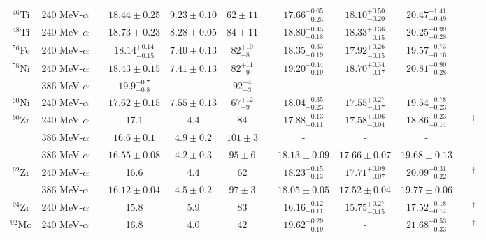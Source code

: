\begin{table}[t!]
{\begin{tabular}{@{}cccccccccc@{}cc}
$^{46}$Ti & 240 MeV-$\alpha$ & & $18.44\pm0.25$ & $9.23\pm0.10$ & $62\pm11 $ & & ${17.66}^{+0.65}_{-0.25}$ & ${18.10}^{+0.50}_{-0.20}$ & ${20.47}^{+1.41}_{-0.49}$ & & \cite{DHY2006_Ti}\\		
$^{48}$Ti & 240 MeV-$\alpha$ & & $18.73\pm0.23$ & $8.28 \pm 0.05$ & $84\pm11 $ & & ${18.80}^{+0.45}_{-0.18}$ & ${18.33}^{+0.36}_{-0.15}$ & ${20.25}^{+0.99}_{-0.28}$ & & \cite{DHY2006_Ti}\\	
$^{56}$Fe & 240 MeV-$\alpha$ & & ${18.14}^{+0.14}_{-0.15}$ & $7.40\pm0.13$ & ${82}^{+10}_{-8}$ & & ${18.35}^{+0.33}_{-0.19}$ & ${17.92}^{+0.26}_{-0.15}$ & ${19.57}^{+0.73}_{-0.16}$ & & \cite{DHY2006_mass60}\\				
$^{58}$Ni &240 MeV-$\alpha$ & & $18.43\pm0.15$ & $7.41\pm0.13$ & ${82}^{+11}_{-9}$ & & ${19.20}^{+0.44}_{-0.19}$ & ${18.70}^{+0.34}_{-0.17}$ & ${20.81}^{+0.90}_{-0.28}$ & & \cite{DHY2006_mass60}\\
  & 386 MeV-$\alpha$ & & $19.9^{+0.7}_{-0.8}$ & - & $92^{+4}_{-3}$  & &   - & -& - & & \cite{nayak58ni} \\ 
$^{60}$Ni & 240 MeV-$\alpha$ & & $17.62\pm0.15$ & $7.55\pm0.13$ & ${67}^{+12}_{-9}$ & & ${18.04}^{+0.35}_{-0.23}$ & ${17.55}^{+0.27}_{-0.17}$ & ${19.54}^{+0.78}_{-0.23}$ & & \cite{DHY2006_mass60}\\
$^{90}$Zr & 240 MeV-$\alpha$ & & 17.1 & 4.4 & 84 & & ${17.88}^{+0.13}_{-0.11}$ & ${17.58}^{+0.06}_{-0.04}$ & ${18.86}^{+0.23}_{-0.14}$ & & \cite{Krishi_2015}$^\dagger$\\					
  & 386 MeV-$\alpha$ & & $16.6\pm0.1$ & $4.9\pm0.2$ & $101\pm3$ & & - & - & - & & \cite{Uchida_90Zr} \\	
  & 386 MeV-$\alpha$ & & $16.55\pm0.08$ & $4.2\pm0.3$ & $95\pm6$ & & $18.13\pm0.09$ & $17.66\pm0.07$ & $19.68\pm0.13$ & & \cite{YKGPLB2016} \\
$^{92}$Zr & 240 MeV-$\alpha$ & & 16.6 & 4.4 & 62 & & ${18.23}^{+0.15}_{-0.13}$ & ${17.71}^{+0.09}_{-0.07}$ & ${20.09}^{+0.31}_{-0.22}$ & & \cite{Krishi_2015}$^\dagger$\\		
  & 386 MeV-$\alpha$ & & $16.12\pm0.04$ & $4.5\pm0.2$ & $97\pm3$ & & $18.05\pm0.05$ & $17.52\pm0.04$ & $19.77\pm0.06$ & & \cite{YKGPLB2016}  \\
$^{94}$Zr &240 MeV-$\alpha$ & & 15.8 & 5.9 & 83 & & ${16.16}^{+0.12}_{-0.11}$ & ${15.75}^{+0.27}_{-0.15}$ & ${17.52}^{+0.18}_{-0.14}$ & & \cite{Krishi_2015}$^\dagger$\\		
$^{92}$Mo & 240 MeV-$\alpha$ & & 16.8 & 4.0 & 42 & & ${19.62}^{+0.29}_{-0.19}$ & - & ${21.68}^{+0.53}_{-0.33}$ & & \cite{DHY_2016_AllMo}$^\dagger$\\						

\end{tabular}}
\end{table}
